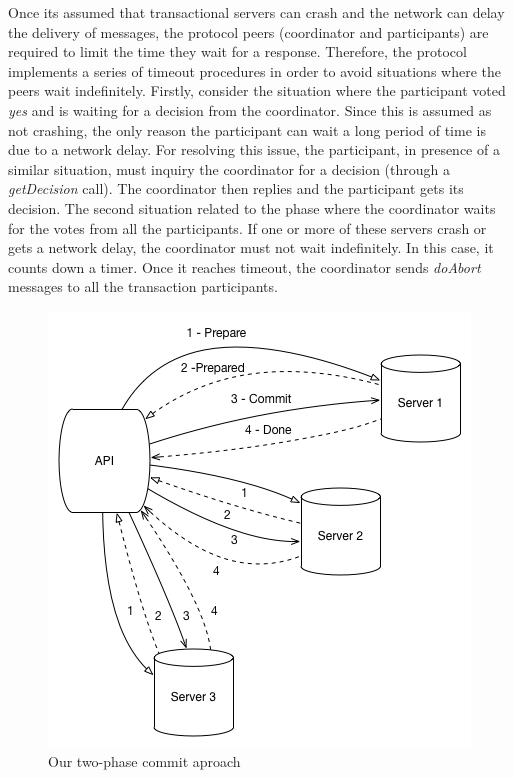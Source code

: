\documentclass[times, 10pt,twocolumn]{article}
\begin{document}
Once its assumed that transactional servers can crash and the network can delay the delivery of messages, the protocol peers (coordinator and participants) are required to limit the time they wait for a response. Therefore, the protocol implements a series of timeout procedures in order to avoid situations where the peers wait indefinitely. 
Firstly, consider the situation where the participant voted \emph{yes} and is waiting for a decision from the coordinator. Since this is assumed as not crashing, the only reason the participant can wait a long period of time is due to a network delay. For resolving this issue, the participant, in presence of a similar situation, must inquiry the coordinator for a decision (through a \emph{getDecision} call). The coordinator then replies and the participant gets its decision.
The second situation related to the phase where the coordinator waits for the votes from all the participants. If one or more of these servers crash or gets a network delay, the coordinator must not wait indefinitely. In this case, it counts down a timer. Once it reaches timeout, the coordinator sends \emph{doAbort} messages to all the transaction participants.

\begin{figure}[h!]
	\centering
	\includegraphics[scale=0.45]{2PC.png}
	\caption{Our two-phase commit aproach}
\end{figure}

\end{document}
